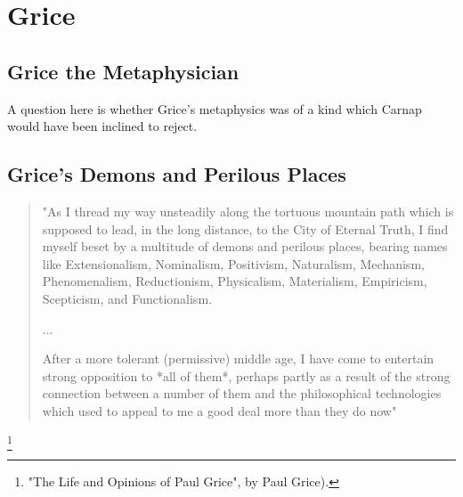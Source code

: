 \documentclass{article}
\newcommand{\ignore}[1]{}
\begin{document}
\ignore{
This is loose Grice. He thinks Gettier etc are too rigid. We  
know more than we care to admit. A schoolboy knows that the battle of 
Trafalgar  was in 1811, etc. So no need to be Phyrronian. I see Jones's pdf. has a 
section  on my favourite philosopher of Antiquity: Phyrro, and so I'm ready 
to  distinguish between good and bad sceptics. They were all good, honest 
people in  fact. I think it's the French philosophers, Voltaire, etc. who gave 
scepticism a  bad name.
}

\ignore{
\subsubection{Reductionism}

One of Grice's B\^etes Noires is reductionism, but his gripe is about a particular kind of reductive analysis, not necessarily everything which might be called reductionism.
}

\section{Grice}

\subsection{Grice the Metaphysician}

A question here is whether Grice's metaphysics was of a kind which Carnap would have been inclined to reject.

\subsection{Grice's Demons and Perilous Places}

\begin{quote}
"As I thread my way unsteadily along the   tortuous mountain 
path which is supposed to lead, in the long  distance,  
to the City of Eternal Truth, I find myself beset by a  
multitude of demons and perilous places, bearing names like  
Extensionalism, Nominalism, Positivism, Naturalism, Mechanism,  
Phenomenalism, Reductionism, Physicalism, Materialism,  
Empiricism, Scepticism, and Functionalism. 

...

After a more tolerant (permissive)  middle age, I have come to  
entertain strong opposition to *all of them*, 
perhaps partly as a result of the strong connection between a  number 
of them and the philosophical technologies which used to appeal  
to me a good deal more than they do  now"
\end{quote}
\footnote{"The Life and Opinions of Paul Grice", by Paul Grice).}
\end{document}

